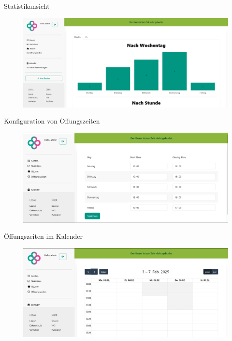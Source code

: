 \documentclass{sdqbeamer}
\begin{document}
    \begin{frame}{Statistikansicht}
        \thispagestyle{plain}
        \begin{figure}
            \centering
            \includegraphics[width=1\linewidth]{admin_statistics.png}
            \label{fig:enter-label}
        \end{figure}
    \end{frame}
    
    \begin{frame}{Konfiguration von Öffungszeiten}
        \thispagestyle{plain}
        \begin{figure}
            \centering
            \includegraphics[width=1\linewidth]{admin_opening_hours.png}
            \label{fig:enter-label}
        \end{figure}
    \end{frame}
    
    \begin{frame}{Öffungszeiten im Kalender}
        \thispagestyle{plain}
        \begin{figure}
            \centering
            \includegraphics[width=1\linewidth]{calendar_opening_hours.png}
            \label{fig:enter-label}
        \end{figure}
    \end{frame}
    
\end{document}
